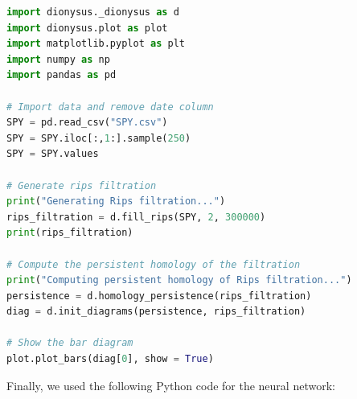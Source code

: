 \documentclass[12pt]{article}
\begin{document}
\begin{lstlisting}[language=Python]
import dionysus._dionysus as d
import dionysus.plot as plot
import matplotlib.pyplot as plt
import numpy as np
import pandas as pd

# Import data and remove date column
SPY = pd.read_csv("SPY.csv")
SPY = SPY.iloc[:,1:].sample(250)
SPY = SPY.values

# Generate rips filtration
print("Generating Rips filtration...")
rips_filtration = d.fill_rips(SPY, 2, 300000)
print(rips_filtration)

# Compute the persistent homology of the filtration
print("Computing persistent homology of Rips filtration...")
persistence = d.homology_persistence(rips_filtration)
diag = d.init_diagrams(persistence, rips_filtration)

# Show the bar diagram
plot.plot_bars(diag[0], show = True)
\end{lstlisting}

Finally, we used the following Python code for the neural network:
\end{document}
